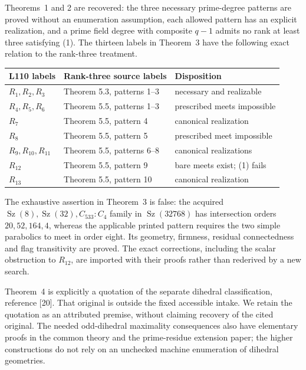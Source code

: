 \documentclass[11pt,a4paper]{article}
\newcommand{\Sz}{\operatorname{Sz}}
\begin{document}
Theorems~1 and 2 are recovered: the three necessary prime-degree patterns
are proved without an enumeration assumption, each allowed pattern has
an explicit realization, and a prime field degree with composite $q-1$
admits no rank at least three satisfying (1). The thirteen labels in
Theorem~3 have the following exact relation to the rank-three treatment.
\begin{center}
\begin{tabular}{lll}
\toprule
L110 labels & Rank-three source labels & Disposition\\
\midrule
$R_1,R_2,R_3$ & Theorem 5.3, patterns 1--3 & necessary and realizable\\
$R_4,R_5,R_6$ & Theorem 5.5, patterns 1--3 & prescribed meets impossible\\
$R_7$ & Theorem 5.5, pattern 4 & canonical realization\\
$R_8$ & Theorem 5.5, pattern 5 & prescribed meet impossible\\
$R_9,R_{10},R_{11}$ & Theorem 5.5, patterns 6--8 & canonical realizations\\
$R_{12}$ & Theorem 5.5, pattern 9 & bare meets exist; (1) fails\\
$R_{13}$ & Theorem 5.5, pattern 10 & canonical realization\\
\bottomrule
\end{tabular}
\end{center}
The exhaustive assertion in Theorem~3 is false: the acquired
$\Sz(8),\Sz(32),C_{533}:C_4$ family in $\Sz(32768)$ has
intersection orders $20,52,164,4$, whereas the applicable printed pattern
requires the two simple parabolics to meet in order eight. Its geometry,
firmness, residual connectedness and flag transitivity are proved.
The exact corrections, including the scalar obstruction to $R_{12}$,
are imported with their proofs rather than rederived by a new search.

Theorem~4 is explicitly a quotation of the separate dihedral classification,
reference [20]. That original is outside the fixed accessible intake.
We retain the quotation as an attributed premise, without claiming recovery
of the cited original. The needed odd-dihedral maximality consequences
also have elementary proofs in the common theory and the prime-residue
extension paper; the higher constructions do not rely on an unchecked
machine enumeration of dihedral geometries.
\end{document}
